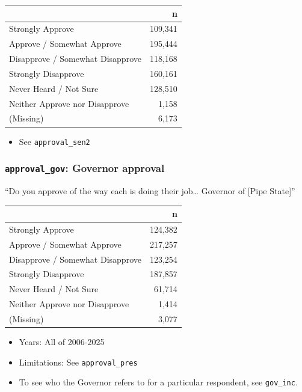 \documentclass[10pt,article,oneside]{memoir}
\begin{document}
\begin{table}[H]
\centering
\begin{tabular}[t]{lr}
\toprule
 & n\\
\midrule
Strongly Approve & 109,341\\
Approve / Somewhat Approve & 195,444\\
Disapprove / Somewhat Disapprove & 118,168\\
Strongly Disapprove & 160,161\\
Never Heard / Not Sure & 128,510\\
Neither Approve nor Disapprove & 1,158\\
(Missing) & 6,173\\
\bottomrule
\end{tabular}
\end{table}

\begin{itemize}
\tightlist
\item
  See \texttt{approval\_sen2}
\end{itemize}

\subsubsection{\texorpdfstring{\texttt{approval\_gov}: Governor
approval}{approval\_gov: Governor approval}}\label{approval_gov-governor-approval}

``Do you approve of the way each is doing their job\ldots{} Governor of
{[}Pipe State{]}''

\begin{table}[H]
\centering
\begin{tabular}[t]{lr}
\toprule
 & n\\
\midrule
Strongly Approve & 124,382\\
Approve / Somewhat Approve & 217,257\\
Disapprove / Somewhat Disapprove & 123,254\\
Strongly Disapprove & 187,857\\
Never Heard / Not Sure & 61,714\\
Neither Approve nor Disapprove & 1,414\\
(Missing) & 3,077\\
\bottomrule
\end{tabular}
\end{table}

\begin{itemize}
\tightlist
\item
  Years: All of 2006-2025
\item
  Limitations: See \texttt{approval\_pres}
\item
  To see who the Governor refers to for a particular respondent, see
  \texttt{gov\_inc}.
\end{itemize}
\end{document}
